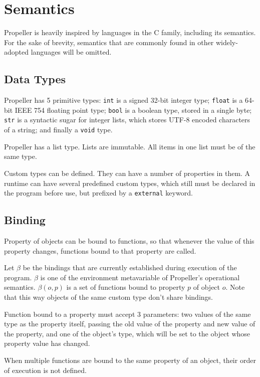 \section{Semantics}

Propeller is heavily inspired by languages in the C family, including its semantics. For the sake of
brevity, semantics that are commonly found in other widely-adopted languages will be omitted.

\subsection{Data Types}

Propeller has 5 primitive types: \verb|int| is a signed 32-bit integer type; \verb|float| is a
64-bit IEEE 754 floating point type; \verb|bool| is a boolean type, stored in a single byte;
\verb|str| is a syntactic sugar for integer lists, which stores UTF-8 encoded characters of a
string; and finally a \verb|void| type.

Propeller has a list type. Lists are immutable. All items in one list must be of the same type.

Custom types can be defined. They can have a number of properties in them. A runtime can have
several predefined custom types, which still must be declared in the program before use, but
prefixed by a \verb|external| keyword.

\subsection{Binding}

Property of objects can be bound to functions, so that whenever the value of this property
changes, functions bound to that property are called.

Let $\beta$ be the bindings that are currently established during execution of the program. $\beta$
is one of the environment metavariable of Propeller's operational semantics.
$\beta(o, p)$ is a set of functions bound to property $p$ of object $o$. Note that this way objects
of the same custom type don't share bindings.

Function bound to a property must accept 3 parameters: two values of the same type as the property
itself, passing the old value of the property and new value of the property, and one of the object's
type, which will be set to the object whose property value has changed.

When multiple functions are bound to the same property of an object, their order of execution is not
defined.

